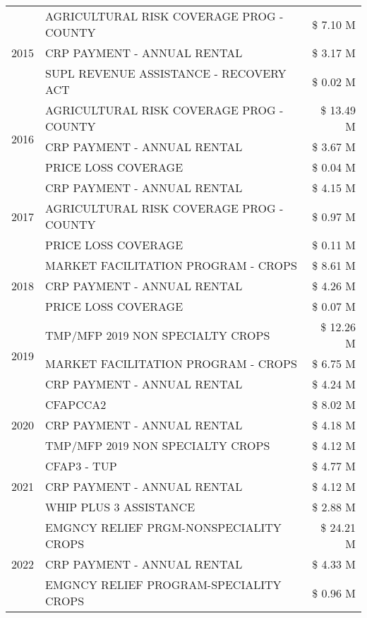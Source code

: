 \begin{tabular}{llr}
\cline{1-3}
\multirow[t]{3}{*}{2015} & AGRICULTURAL RISK COVERAGE PROG - COUNTY & \$ 7.10 M \\
 & CRP PAYMENT - ANNUAL RENTAL & \$ 3.17 M \\
 & SUPL REVENUE ASSISTANCE - RECOVERY ACT & \$ 0.02 M \\
\cline{1-3}
\multirow[t]{3}{*}{2016} & AGRICULTURAL RISK COVERAGE PROG - COUNTY & \$ 13.49 M \\
 & CRP PAYMENT - ANNUAL RENTAL & \$ 3.67 M \\
 & PRICE LOSS COVERAGE & \$ 0.04 M \\
\cline{1-3}
\multirow[t]{3}{*}{2017} & CRP PAYMENT - ANNUAL RENTAL & \$ 4.15 M \\
 & AGRICULTURAL RISK COVERAGE PROG - COUNTY & \$ 0.97 M \\
 & PRICE LOSS COVERAGE & \$ 0.11 M \\
\cline{1-3}
\multirow[t]{3}{*}{2018} & MARKET FACILITATION PROGRAM - CROPS & \$ 8.61 M \\
 & CRP PAYMENT - ANNUAL RENTAL & \$ 4.26 M \\
 & PRICE LOSS COVERAGE & \$ 0.07 M \\
\cline{1-3}
\multirow[t]{3}{*}{2019} & TMP/MFP 2019 NON SPECIALTY CROPS & \$ 12.26 M \\
 & MARKET FACILITATION PROGRAM - CROPS & \$ 6.75 M \\
 & CRP PAYMENT - ANNUAL RENTAL & \$ 4.24 M \\
\cline{1-3}
\multirow[t]{3}{*}{2020} & CFAPCCA2 & \$ 8.02 M \\
 & CRP PAYMENT - ANNUAL RENTAL & \$ 4.18 M \\
 & TMP/MFP 2019 NON SPECIALTY CROPS & \$ 4.12 M \\
\cline{1-3}
\multirow[t]{3}{*}{2021} & CFAP3 - TUP & \$ 4.77 M \\
 & CRP PAYMENT - ANNUAL RENTAL & \$ 4.12 M \\
 & WHIP PLUS 3 ASSISTANCE & \$ 2.88 M \\
\cline{1-3}
\multirow[t]{3}{*}{2022} & EMGNCY RELIEF PRGM-NONSPECIALITY CROPS & \$ 24.21 M \\
 & CRP PAYMENT - ANNUAL RENTAL & \$ 4.33 M \\
 & EMGNCY RELIEF PROGRAM-SPECIALITY CROPS & \$ 0.96 M \\
\cline{1-3}
\bottomrule
\end{tabular}
